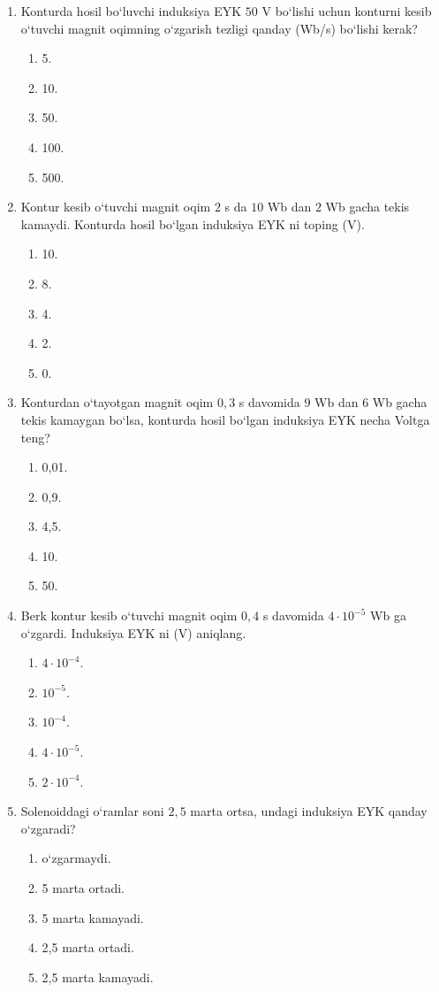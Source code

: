 \begin{enumerate}
\item Konturda hosil bo‘luvchi induksiya EYK $50$ V bo‘lishi uchun konturni kesib o‘tuvchi magnit oqimning o‘zgarish tezligi qanday (Wb/s) bo‘lishi kerak?
\begin{enumerate}[label=\Alph*)]
\item 5.
\item 10.
\item 50.
\item 100.
\item 500.
\end{enumerate}

\item Kontur kesib o‘tuvchi magnit oqim $2$ s da $10$ Wb dan $2$ Wb gacha tekis kamaydi. Konturda hosil bo‘lgan induksiya EYK ni toping (V).
\begin{enumerate}[label=\Alph*)]
\item 10.
\item 8.
\item 4.
\item 2.
\item 0.
\end{enumerate}

\item Konturdan o‘tayotgan magnit oqim $0,3$ s davomida $9$ Wb dan $6$ Wb gacha tekis kamaygan bo‘lsa, konturda hosil bo‘lgan induksiya EYK necha Voltga teng?
\begin{enumerate}[label=\Alph*)]
\item 0,01.
\item 0,9.
\item 4,5.
\item 10.
\item 50.
\end{enumerate}

\item Berk kontur kesib o‘tuvchi magnit oqim $0,4$ s davomida $4\cdot10^{-5}$ Wb ga o‘zgardi. Induksiya EYK ni (V) aniqlang.
\begin{enumerate}[label=\Alph*)]
\item $4\cdot10^{-4}$.
\item $10^{-5}$.
\item $10^{-4}$.
\item $4\cdot10^{-5}$.
\item $2\cdot10^{-4}$.
\end{enumerate}

\item Solenoiddagi o‘ramlar soni $2,5$ marta ortsa, undagi induksiya EYK qanday o‘zgaradi?
\begin{enumerate}[label=\Alph*)]
\item o‘zgarmaydi.
\item 5 marta ortadi.
\item 5 marta kamayadi.
\item 2,5 marta ortadi.
\item 2,5 marta kamayadi.
\end{enumerate}


\end{enumerate}
